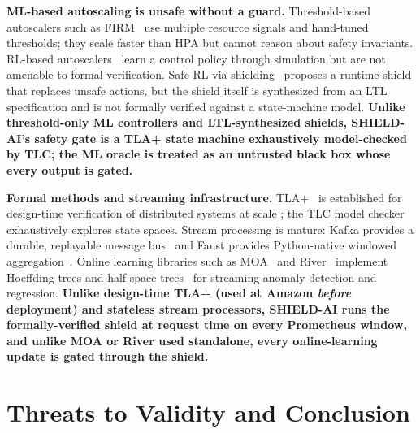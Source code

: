 \documentclass[conference,10pt]{IEEEtran}
\begin{document}
\textbf{ML-based autoscaling is unsafe without a guard.}
Threshold-based autoscalers such as FIRM~\cite{lim_firm_2020} use
multiple resource signals and hand-tuned thresholds; they scale
faster than HPA but cannot reason about safety invariants. RL-based
autoscalers~\cite{alstream_arpit_reinforcement_autoscaler_2018}
learn a control policy through simulation but are not amenable to
formal verification. Safe RL via shielding~\cite{shielding_safe_rl}
proposes a runtime shield that replaces unsafe actions, but the
shield itself is synthesized from an LTL specification and is not
formally verified against a state-machine model. \textbf{Unlike
threshold-only ML controllers and LTL-synthesized shields,
SHIELD-AI's safety gate is a TLA+ state machine exhaustively
model-checked by TLC; the ML oracle is treated as an untrusted black
box whose every output is gated.}

\textbf{Formal methods and streaming infrastructure.}
TLA+~\cite{lamport_tla_1994} is established for design-time
verification of distributed systems at scale
\cite{aws_tla_yu}; the TLC model checker~\cite{tlc_doc} exhaustively
explores state spaces. Stream processing is mature: Kafka provides a
durable, replayable message bus~\cite{kafka_2015} and Faust
provides Python-native windowed aggregation~\cite{faust_doc}.
Online learning libraries such as MOA~\cite{bifet_moa_2010} and
River~\cite{river_jmlr_2020} implement Hoeffding trees
\cite{htr_kdd_2001} and half-space trees~\cite{half_space_trees_kdd_2011}
for streaming anomaly detection and regression. \textbf{Unlike
design-time TLA+ (used at Amazon \emph{before} deployment) and
stateless stream processors, SHIELD-AI runs the formally-verified
shield at request time on every Prometheus window, and unlike MOA or
River used standalone, every online-learning update is gated through
the shield.}

\section{Threats to Validity and Conclusion}
\label{sec:threats}
\end{document}
